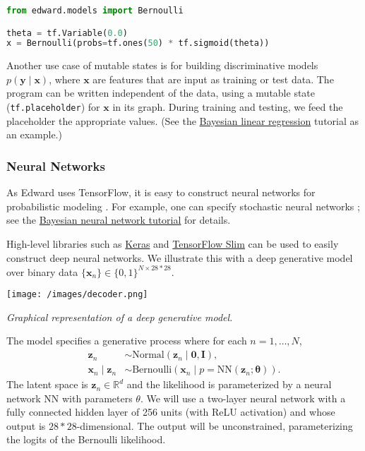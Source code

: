 \begin{lstlisting}[language=python]
from edward.models import Bernoulli

theta = tf.Variable(0.0)
x = Bernoulli(probs=tf.ones(50) * tf.sigmoid(theta))
\end{lstlisting}

Another use case of mutable states is for building discriminative
models $p(\mathbf{y}\mid\mathbf{x})$, where $\mathbf{x}$ are features
that are input as training or test data. The program can be written
independent of the data, using a mutable state
(\texttt{tf.placeholder}) for $\mathbf{x}$ in its graph. During
training and testing, we feed the placeholder the appropriate values.
(See the
\href{/tutorials/supervised-regression}{Bayesian linear
regression} tutorial as an example.)

\subsubsection{Neural Networks}

As Edward uses TensorFlow, it is easy to construct neural networks for
probabilistic modeling \citep{rumelhart1988parallel}.
For example, one can specify stochastic neural networks
\citep{neal1990learning}; see the
\href{/tutorials/bayesian-neural-network}{Bayesian neural network tutorial}
for details.

High-level libraries such as
\href{http://keras.io}{Keras} and
\href{https://github.com/tensorflow/tensorflow/tree/master/tensorflow/contrib/slim}{TensorFlow Slim}
can be used to easily construct deep neural networks.
We illustrate this with a deep generative model over binary data
$\{\mathbf{x}_n\}\in\{0,1\}^{N\times 28*28}$.

\texttt{[image: /images/decoder.png]}

{\small\textit{Graphical representation of a deep generative model.}}

The model specifies a generative process where for each
$n=1,\ldots,N$,
%
\begin{align*}
\mathbf{z}_n &\sim \text{Normal}(\mathbf{z}_n \mid \mathbf{0}, \mathbf{I}), \\[1.5ex]
\mathbf{x}_n\mid \mathbf{z}_n &\sim \text{Bernoulli}(\mathbf{x}_n\mid
p=\mathrm{NN}(\mathbf{z}_n; \mathbf{\theta})).
\end{align*}
%
The latent space is $\mathbf{z}_n\in\mathbb{R}^d$ and the
likelihood is parameterized by a neural network $\mathrm{NN}$ with
parameters $\theta$. We will use a two-layer neural network with a
fully connected hidden layer of 256 units (with ReLU activation) and
whose output is $28*28$-dimensional. The output will be unconstrained,
parameterizing the logits of the Bernoulli likelihood.


